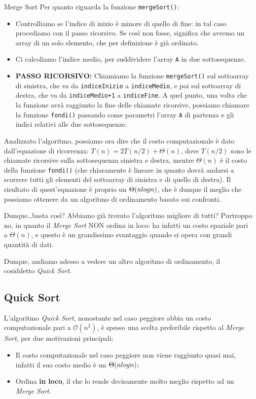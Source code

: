 \documentclass[12pt]{report}
\begin{document}
\begin{algoritmo}{Merge Sort}{}
    	Per quanto riguarda la funzione \texttt{mergeSort()}:
    	\begin{itemize}
    		\item Controlliamo se l'indice di inizio è minore di quello di fine: in tal caso procediamo con il passo ricorsivo. Se così non fosse, significa che avremo un array di un solo elemento, che per definizione è già ordinato.
    		\item Ci calcoliamo l'indice medio, per suddividere l'array \texttt{A} in due sottosequenze.
    		\item \textbf{PASSO RICORSIVO:} Chiamiamo la funzione \texttt{mergeSort()} sul sottoarray di sinistra, che va da \texttt{indiceInizio} a \texttt{indiceMedio}, e poi sul sottoarray di destra, che va da \texttt{indiceMedio+1} a \texttt{indiceFine}. A quel punto, una volta che la funzione avrà raggiunto la fine delle chiamate ricorsive, possiamo chiamare la funzione \texttt{fondi()} passando come parametri l'array \texttt{A} di partenza e gli indici relativi alle due sottosequenze.
    	\end{itemize}
    \end{algoritmo}
    
    Analizzato l'algoritmo, possiamo ora dire che il costo computazionale è dato dall'equazione di ricorrenza: $T(n) = 2T(n/2) + \Theta(n)$, dove $T(n/2)$ sono le chiamate ricorsive sulla sottosequenza sinistra e destra, mentre $\Theta(n)$ è il costo della funzione \texttt{fondi()} (che chiaramente è lineare in quanto dovrà andarsi a scorrere tutti gli elementi del sottoarray di sinistra e di quello di destra). Il risultato di quest'equazione è proprio un $\Theta(n \\log n)$, che è dunque il meglio che possiamo ottenere da un algoritmo di ordinamento basato sui confronti.
    
    Dunque\dots basta così? Abbiamo già trovato l'algoritmo migliore di tutti?
    Purtroppo no, in quanto il \textit{Merge Sort} NON ordina in loco: ha infatti un costo spaziale pari a $\Theta(n)$, e questo è un grandissimo svantaggio quando si opera con grandi quantità di dati.
    
    Dunque, andiamo adesso a vedere un altro algoritmo di ordinamento, il cosiddetto \textit{Quick Sort}.
    
    \subsection{Quick Sort}
    L'algoritmo \textit{Quick Sort}, nonostante nel caso peggiore abbia un costo computazionale pari a $\mathcal{O}(n^2)$, è spesso una scelta preferibile rispetto al \textit{Merge Sort}, per due motivazioni principali:
    \begin{itemize}
    	\item Il costo computazionale nel caso peggiore non viene raggiunto quasi mai, infatti il suo costo medio è un $\Theta(n \\log n)$;
    	\item Ordina \textbf{in loco}, il che lo rende decisamente molto meglio rispetto ad un \textit{Merge Sort}.
    \end{itemize}
    
\end{document}

